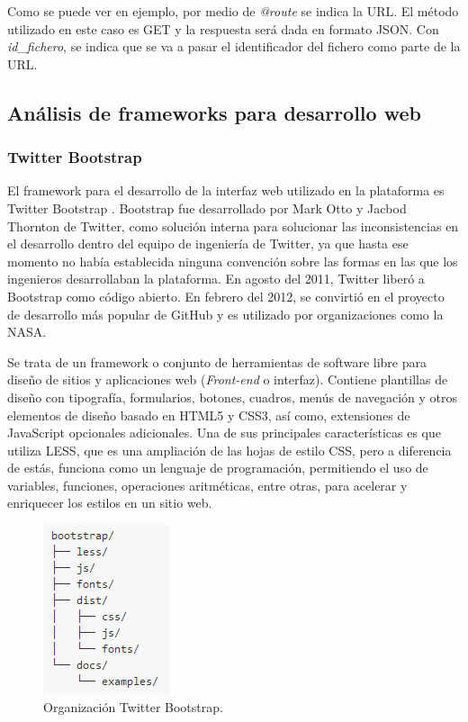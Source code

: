 Como se puede ver en ejemplo, por medio de \textit{@route} se indica la URL. El método utilizado en este caso es GET y la respuesta será dada en formato JSON. Con \textit{id\_fichero}, se indica que se va a pasar el identificador del fichero como parte de la URL.

\subsection{Análisis de frameworks para desarrollo web}

\subsubsection{\textbf{Twitter Bootstrap}}
El framework para el desarrollo de la interfaz web utilizado en la plataforma es Twitter Bootstrap \cite{bootstrap}. Bootstrap fue desarrollado por Mark Otto y Jacbod Thornton de Twitter, como solución interna para solucionar las inconsistencias en el desarrollo dentro del equipo de ingeniería de Twitter, ya que hasta ese momento no había establecida ninguna convención sobre las formas en las que los ingenieros desarrollaban la plataforma. En agosto del 2011, Twitter liberó a Bootstrap como código abierto. En febrero del 2012, se convirtió en el proyecto de desarrollo más popular de GitHub \cite{github} y es utilizado por organizaciones como la NASA.

Se trata de un framework o conjunto de herramientas de software libre para diseño de sitios y aplicaciones web (\textit{Front-end} o interfaz). Contiene plantillas de diseño con tipografía, formularios, botones, cuadros, menús de navegación y otros elementos de diseño basado en HTML5 y CSS3, así como, extensiones de JavaScript opcionales adicionales. Una de sus principales características es que utiliza LESS, que es una ampliación de las hojas de estilo CSS, pero a diferencia de estás, funciona como un lenguaje de programación, permitiendo el uso de variables, funciones, operaciones aritméticas, entre otras, para acelerar y enriquecer los estilos en un sitio web.

\begin{figure}[H]
\centering
\includegraphics{figuras/bootstrap.png}
\caption{Organización Twitter Bootstrap.}
\label{fig:booststrap}
\end{figure}

